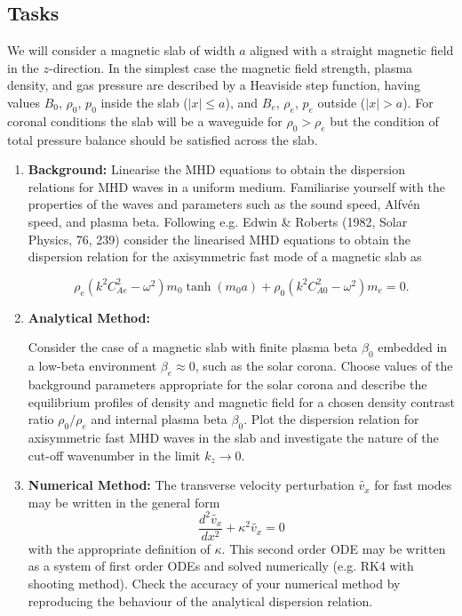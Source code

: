 \documentclass[11pt]{article}
\begin{document}
\subsection{Tasks}
We will consider a magnetic slab of width $a$ aligned with a straight magnetic field in the $z$-direction.
In the simplest case the magnetic field strength, plasma density, and gas pressure are described by a Heaviside step function, having values $B_{0}$, $\rho_{0}$, $p_{0}$ inside the slab ($|x| \le a$), and $B_{e}$, $\rho_{e}$, $p_{e}$ outside ($|x| > a$).
For coronal conditions the slab will be a waveguide for $\rho_{0} > \rho_{e}$ but the condition of total pressure balance should be satisfied across the slab.

\begin{enumerate}
\item {\bf Background:}
Linearise the MHD equations to obtain the dispersion relations for MHD waves in a uniform medium.
Familiarise yourself with the properties of the waves and parameters such as the sound speed, Alfv\'en speed, and plasma beta.
Following e.g. Edwin \& Roberts (1982, Solar Physics, 76, 239) consider the linearised MHD equations to obtain the dispersion relation for 
the axisymmetric fast mode of a magnetic slab as

\begin{equation*}
\rho_{e} \left(k^2 C_{Ae}^2 - \omega^2 \right) m_{0} \tanh{\left(m_{0} a \right)} + \rho_{0} \left(k^2 C_{A0}^2 - \omega^2 \right) m_{e} = 0.
\end{equation*}


\item {\bf Analytical Method:}

Consider the case of a magnetic slab with finite plasma beta $\beta_{0}$ embedded in a low-beta environment $\beta_{e} \approx 0$, such as the solar corona.
Choose values of the background parameters appropriate for the solar corona and describe the equilibrium profiles of density and magnetic field for a chosen density contrast ratio $\rho_{0}/\rho_{e}$ and internal plasma beta $\beta_{0}$.
Plot the dispersion relation for axisymmetric fast MHD waves in the slab and investigate the nature of the cut-off wavenumber in the limit $k_{z} \to 0$.


\item {\bf Numerical Method:}
The transverse velocity perturbation $\tilde{v_x}$ for fast modes may be written in the general form
\begin{equation*}
\frac{d^2 \tilde{v_x}}{d x^2} + \kappa^2 \tilde{v_x} = 0
\end{equation*}
with the appropriate definition of $\kappa$.
This second order ODE may be written as a system of first order ODEs and solved numerically (e.g. \textsc{RK4} with shooting method).
Check the accuracy of your numerical method by reproducing the behaviour of the analytical dispersion relation.



\end{enumerate}
\end{document}
